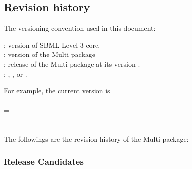 \subsection{Revision history}
\label{def:revision_history}

The versioning convention used in this document: \\

: version of SBML Level 3 core. \\
: version of the Multi package. \\
: release of the Multi package at its version . \\ 
: , , or . 

For example, the current version is \val{\thisVersion\ (\thisVersionStatusLc)} \\
 = \val{\thisCoreVersion} \\
 = \val{\thisMultiVersion} \\
 = \val{\thisMultiRelease} \\
 = \val{\thisVersionStatusLc} \\

The followings are the revision history of the Multi package:

\newcommand{\mVersionTileFont}[1]{\textbf{#1}}

\subsubsection{Release Candidates}

